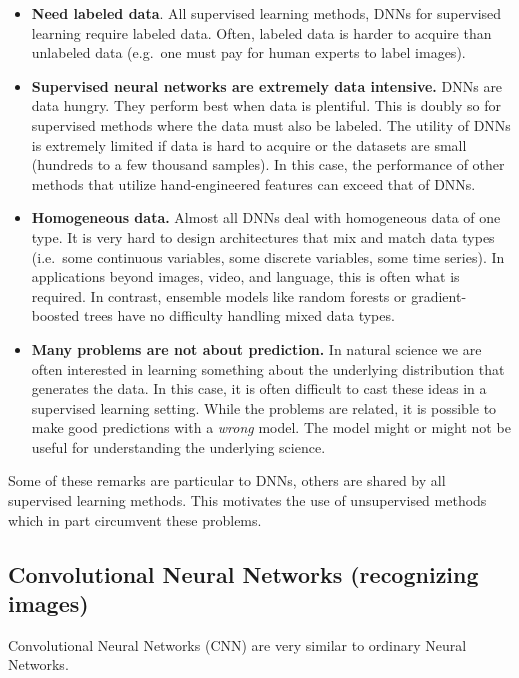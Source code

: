 \documentclass[%
oneside,                 %
final,                   %
10pt]{article}
\begin{document}
\begin{itemize}
\item \textbf{Need labeled data}. All supervised learning methods, DNNs for supervised learning require labeled data. Often, labeled data is harder to acquire than unlabeled data (e.g.~one must pay for human experts to label images).

\item \textbf{Supervised neural networks are extremely data intensive.} DNNs are data hungry. They perform best when data is plentiful. This is doubly so for supervised methods where the data must also be labeled. The utility of DNNs is extremely limited if data is hard to acquire or the datasets are small (hundreds to a few thousand samples). In this case, the performance of other methods that utilize hand-engineered features can exceed that of DNNs.

\item \textbf{Homogeneous data.} Almost all DNNs deal with homogeneous data of one type. It is very hard to design architectures that mix and match data types (i.e.~some continuous variables, some discrete variables, some time series). In applications beyond images, video, and language, this is often what is required. In contrast, ensemble models like random forests or gradient-boosted trees have no difficulty handling mixed data types.

\item \textbf{Many problems are not about prediction.} In natural science we are often interested in learning something about the underlying distribution that generates the data. In this case, it is often difficult to cast these ideas in a supervised learning setting. While the problems are related, it is possible to make good predictions with a \emph{wrong} model. The model might or might not be useful for understanding the underlying science.
\end{itemize}

\noindent
Some of these remarks are particular to DNNs, others are shared by all supervised learning methods. This motivates the use of unsupervised methods which in part circumvent these problems.


\subsection{Convolutional Neural Networks (recognizing images)}

Convolutional Neural Networks (CNN) are very similar to ordinary Neural Networks.
\end{document}
